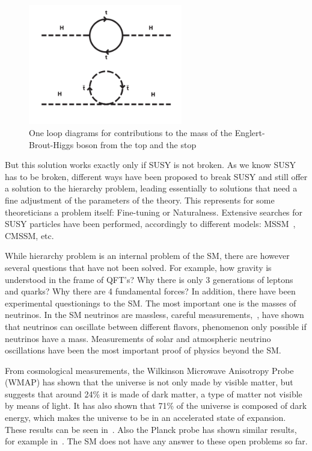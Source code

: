 \begin{figure}[!Hhtbp]
  \begin{center}
    \includegraphics[width=0.6\textwidth]{figs/SUSY.png}
    \caption{One loop diagrams for contributions to the mass of the Englert-Brout-Higgs boson from the top and the stop}
    \label{fig:susy}
  \end{center}
\end{figure}

But this solution works exactly only if SUSY is not broken. As we know SUSY has to be broken, different ways have been proposed to break SUSY and still offer a solution to the hierarchy problem, leading essentially to solutions that need a fine adjustment of the parameters of the theory. This represents for some theoreticians a problem itself: Fine-tuning or Naturalness. Extensive searches for SUSY particles have been performed, accordingly to different models: MSSM~\cite{Khachatryan:2014wca,Aad:2014vgg}, CMSSM, etc.

While hierarchy problem is an internal problem of the SM, there are however several questions that have not been solved. For example, how gravity is understood in the frame of QFT's? Why there is only 3 generations of leptons and quarks? Why there are 4 fundamental forces? In addition, there have been experimental questionings to the SM. The most important one is the masses of neutrinos. In the SM neutrinos are massless, careful measurements,~\cite{Ashie:2004mr, Weinheimer:2013hya}, have shown that neutrinos can oscillate between different flavors, phenomenon only possible if neutrinos have a mass. Measurements of solar and atmospheric neutrino oscillations have been the most important proof of physics beyond the SM. 

From cosmological measurements, the Wilkinson Microwave Anisotropy Probe (WMAP) has shown that the universe is not only made by visible matter, but suggests that around 24\% it is made of dark matter, a type of matter not visible by means of light. It has also shown that 71\% of the universe is composed of dark energy, which makes the universe to be in an accelerated state of expansion. These results can be seen in~\cite{2013ApJS..208...20B, 2013ApJS..208...19H}. Also the Planck probe has shown similar results, for example in~\cite{Planck:2015xua}. The SM does not have any answer to these open problems so far. 


